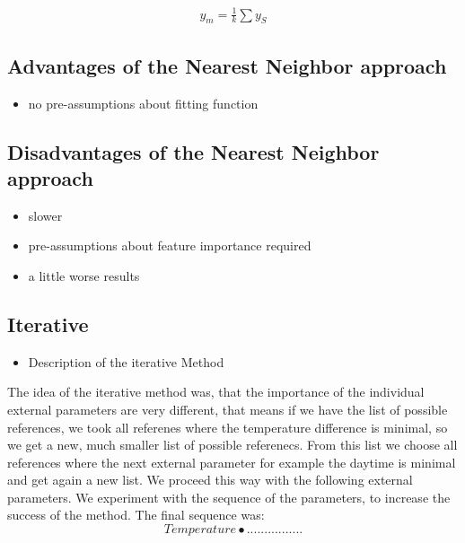 \documentclass  [
  paper    = a4,
  BCOR     = 10mm,
  twoside,
  fontsize = 12pt,
  fleqn,
  toc      = bibnumbered,
  toc      = listofnumbered,
  numbers  = noendperiod,
  headings = normal,
  listof   = leveldown,
  version  = 3.03
]                                       {scrreprt}
\begin{document}
%

\begin{align}
y_m = \frac{1}{k} \sum y_S \label{eq:knn_regression}
\end{align}

%

\subsection*{Advantages of the Nearest Neighbor approach}

\begin{itemize}
	
	\item no pre-assumptions about fitting function 
	
\end{itemize}

%

\subsection*{Disadvantages of the Nearest Neighbor approach}

\begin{itemize}
	\item slower
	\item pre-assumptions about feature importance required  
	\item a little worse results
\end{itemize}

%















	\subsection{Iterative}
	\begin{itemize}
		\item Description of the iterative Method
	\end{itemize}
	The idea of the iterative method was, that the importance of the individual external parameters are very different, that means if we have the list of possible references, we took all referenes where the temperature difference is minimal, so we get a new, much smaller list of possible referenecs. From this list we choose all references where the next external parameter for example the daytime is minimal and get again a new list. We proceed this way with the following external parameters. We experiment with the sequence of the parameters, to increase the success of the method. The final sequence was:
	\begin{equation*}
	Temperature \bullet ................
	\end{equation*} 
	
\end{document}
